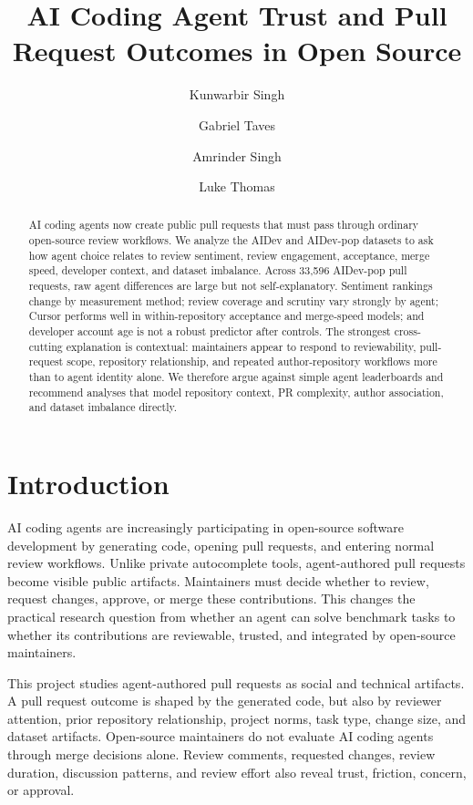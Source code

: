 \documentclass[sigconf,nonacm]{acmart}
\title{AI Coding Agent Trust and Pull Request Outcomes in Open Source}
\author{Kunwarbir Singh}
\author{Gabriel Taves}
\author{Amrinder Singh}
\author{Luke Thomas}
\affiliation{\institution{SENG 404 -- Group 6 / Project 6}}
\begin{document}
\begin{abstract}
AI coding agents now create public pull requests that must pass through ordinary open-source review workflows. We analyze the AIDev and AIDev-pop datasets to ask how agent choice relates to review sentiment, review engagement, acceptance, merge speed, developer context, and dataset imbalance. Across 33,596 AIDev-pop pull requests, raw agent differences are large but not self-explanatory. Sentiment rankings change by measurement method; review coverage and scrutiny vary strongly by agent; Cursor performs well in within-repository acceptance and merge-speed models; and developer account age is not a robust predictor after controls. The strongest cross-cutting explanation is contextual: maintainers appear to respond to reviewability, pull-request scope, repository relationship, and repeated author-repository workflows more than to agent identity alone. We therefore argue against simple agent leaderboards and recommend analyses that model repository context, PR complexity, author association, and dataset imbalance directly.
\end{abstract}

\maketitle

\section{Introduction}

AI coding agents are increasingly participating in open-source software development by generating code, opening pull requests, and entering normal review workflows. Unlike private autocomplete tools, agent-authored pull requests become visible public artifacts. Maintainers must decide whether to review, request changes, approve, or merge these contributions. This changes the practical research question from whether an agent can solve benchmark tasks to whether its contributions are reviewable, trusted, and integrated by open-source maintainers.

This project studies agent-authored pull requests as social and technical artifacts. A pull request outcome is shaped by the generated code, but also by reviewer attention, prior repository relationship, project norms, task type, change size, and dataset artifacts. Open-source maintainers do not evaluate AI coding agents through merge decisions alone. Review comments, requested changes, review duration, discussion patterns, and review effort also reveal trust, friction, concern, or approval.
\end{document}
